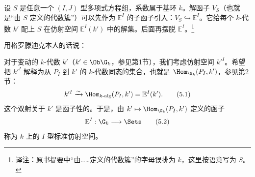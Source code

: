 设 $S$ 是任意一个 $(I,J)$ 型多项式方程组，系数属于基环 $k$。解函子 $V_S$（也就是“由 $S$ 定义的代数簇”）可以先作为 $\mathbb E^I$ 的子函子引入：$V_S\hookrightarrow\mathbb E^I$。它给每个 $k$-代数 $k'$ 配上 $S$ 在仿射空间 $\mathbb E^I(k')$ 中的解集。后面再摆脱 $\mathbb E^I$。\footnote{译注：原书提要中“由……定义的代数簇”的字母误排为 $k$，这里按语意写为 $S$。}

用格罗滕迪克本人的话说：

对于变动的 $k$-代数 $k'$（$k'\in\Ob\G_k$，参见第1节），我们考虑仿射空间 $k'^I$。希望把 $k'^I$ 解释为从 $P_I$ 到 $k'$ 的 $k$-代数同态的集合，也就是 $\Hom_{\G_k}(P_I,k')$，参见第2节：
\[
k'^I\xrightarrow{\sim}\Hom_{k\text{-alg}}(P_I,k')=\mathbb E^I(k').\tag{5.1}
\]
这个双射关于 $k'$ 是函子性的。于是，由 $k'\mapsto\Hom_{\G_k}(P_I,k')$ 定义的函子
\[
\mathbb E^I:\G_k\longrightarrow\Sets\tag{5.2}
\]
称为 $k$ 上的 $I$ 型标准仿射空间。
